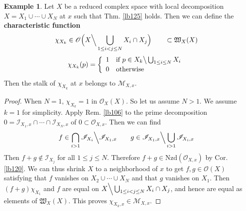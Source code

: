 \documentclass[12pt,b5paper,notitlepage]{report}
\theoremstyle{definition}
\newtheorem{eg}[df]{Example}
\theoremstyle{plain}
\newcommand{\fk}{\mathfrak}
\newcommand{\scr}{\mathscr}
\newcommand{\Nzd}{\mathrm{Nzd}}
\numberwithin{equation}{section}
\begin{document}
\begin{eg}\label{lb213}
Let $X$ be a reduced complex space with local decomposition $X=X_1\cup\cdots\cup X_N$ at $x$ such that Thm. \ref{lb125} holds. Then we can define the \textbf{characteristic function} 
\begin{gather}
\begin{gathered}
\chi_{X_k}\in\scr O\Big(X\Big\backslash\bigcup_{1\leq i<j\leq N}X_i\cap X_j\Big)\qquad\subset \fk W_X(X)\\[0.5ex]
\chi_{X_k}(p)=\left\{\begin{array}{ll}
1 & \text{if }p\in X_k\big\backslash\bigcup_{1\leq i\leq N} X_i\\[0.5ex]
0 & \text{otherwise}
\end{array}\right.
\end{gathered}
\end{gather}
Then the stalk of $\chi_{X_k}$ at $x$ belongs to $\scr M_{X,x}$.
\end{eg}

\begin{proof}
When $N=1$, $\chi_{X_k}=1$ in $\scr O_X(X)$.  So let us assume $N>1$. We assume $k=1$ for simplicity. Apply Rem. \ref{lb106} to the prime decomposition $0=\scr I_{X_1,x}\cap\cdots\cap\scr I_{X_N,x}$ of $0\subset\scr O_{X,x}$. Then we can find
\begin{align*}
f\in\bigcap_{i>1}\scr I_{X_i}\Big\backslash\scr I_{X_1,x}\qquad g\in \scr I_{X_1,x}\Big\backslash\bigcup_{i>1}\scr I_{X_i,x}
\end{align*}
Then $f+g\notin \scr I_{X_j}$ for all $1\leq j\leq N$. Therefore $f+g\in\Nzd(\scr O_{X,x})$ by Cor. \ref{lb120}. We can thus shrink $X$ to a neighborhood of $x$ to get $f,g\in\scr O(X)$ satisfying that $f$ vanishes on $X_2\cup\cdots\cup X_N$ and that $g$ vanishes on $X_1$. Then $(f+g)\chi_{X_1}$ and $f$ are equal on $X\Big\backslash\bigcup_{1\leq i<j\leq N}X_i\cap X_j$, and hence are equal as elements of $\fk W_X(X)$. This proves $\chi_{X_k,x}\in\scr M_{X,x}$.
\end{proof}
\end{document}
